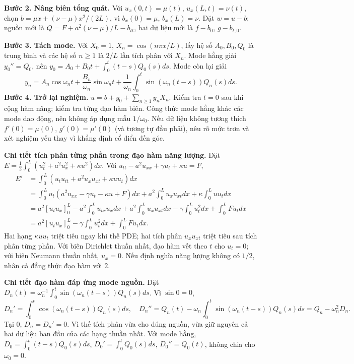 \documentclass[10pt,a4paper]{article}
\begin{document}
\textbf{Bước 2. Nâng biên tổng quát.} Với $u_x(0,t)=\mu(t)$, $u_x(L,t)=\nu(t)$, chọn $b=\mu x+(\nu-\mu)x^2/(2L)$, vì $b_x(0)=\mu$, $b_x(L)=\nu$. Đặt $w=u-b$; nguồn mới là $Q=F+a^2(\nu-\mu)/L-b_{tt}$, hai dữ liệu mới là $f-b_0$, $g-b_{t,0}$.

\textbf{Bước 3. Tách mode.} Với $X_0=1$, $X_n=\cos(n\pi x/L)$, lấy hệ số $A_0,B_0,Q_0$ là trung bình và các hệ số $n\ge1$ là $2/L$ lần tích phân với $X_n$. Mode hằng giải $y_0''=Q_0$, nên $y_0=A_0+B_0t+\int_0^t(t-s)Q_0(s)ds$. Mode còn lại giải
\[y_n=A_n\cos\omega_nt+\frac{B_n}{\omega_n}\sin\omega_nt+\frac1{\omega_n}\int_0^t\sin(\omega_n(t-s))Q_n(s)ds.\]
\textbf{Bước 4. Trở lại nghiệm.} $u=b+y_0+\sum_{n\ge1}y_nX_n$. Kiểm tra $t=0$ sau khi cộng hàm nâng; kiểm tra từng đạo hàm biên. Công thức mode hằng khác các mode dao động, nên không áp dụng mẫu $1/\omega_0$. Nếu dữ liệu không tương thích $f'(0)=\mu(0)$, $g'(0)=\mu'(0)$ (và tương tự đầu phải), nêu rõ mức trơn và xét nghiệm yếu thay vì khẳng định cổ điển đến góc.

\textbf{Chi tiết tích phân từng phần trong đạo hàm năng lượng.} Đặt $E=\frac12\int_0^L(u_t^2+a^2u_x^2+\kappa u^2)dx$. Với $u_{tt}-a^2u_{xx}+\gamma u_t+\kappa u=F$,
\[\begin{aligned}
E'&=\int_0^L(u_tu_{tt}+a^2u_xu_{xt}+\kappa uu_t)dx\\
&=\int_0^Lu_t(a^2u_{xx}-\gamma u_t-\kappa u+F)dx
+a^2\int_0^Lu_xu_{xt}dx+\kappa\int_0^Luu_tdx\\
&=a^2[u_tu_x]_0^L-a^2\int_0^Lu_{tx}u_xdx
+a^2\int_0^Lu_xu_{xt}dx-\gamma\int_0^Lu_t^2dx+\int_0^LFu_tdx\\
&=a^2[u_tu_x]_0^L-\gamma\int_0^Lu_t^2dx+\int_0^LFu_tdx.
\end{aligned}\]
Hai hạng $\kappa uu_t$ triệt tiêu ngay khi thế PDE; hai tích phân $u_xu_{xt}$ triệt tiêu sau tích phân từng phần. Với biên Dirichlet thuần nhất, đạo hàm vết theo $t$ cho $u_t=0$; với biên Neumann thuần nhất, $u_x=0$. Nếu định nghĩa năng lượng không có $1/2$, nhân cả đẳng thức đạo hàm với $2$.

\textbf{Chi tiết đạo hàm đáp ứng mode nguồn.} Đặt $D_n(t)=\omega_n^{-1}\int_0^t\sin(\omega_n(t-s))Q_n(s)ds$. Vì $\sin0=0$,
\[D_n'=\int_0^t\cos(\omega_n(t-s))Q_n(s)ds,\quad
D_n''=Q_n(t)-\omega_n\int_0^t\sin(\omega_n(t-s))Q_n(s)ds=Q_n-\omega_n^2D_n.\]
Tại $0$, $D_n=D_n'=0$. Vì thế tích phân vừa cho đúng nguồn, vừa giữ nguyên cả hai dữ liệu ban đầu của các hạng thuần nhất. Với mode hằng, $D_0=\int_0^t(t-s)Q_0(s)ds$, $D_0'=\int_0^tQ_0(s)ds$, $D_0''=Q_0(t)$, không chia cho $\omega_0=0$.
\end{document}
